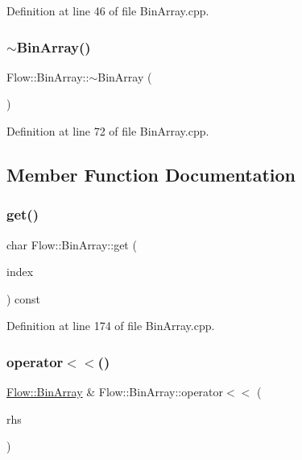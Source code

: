 Definition at line 46 of file Bin\+Array.\+cpp.

\hypertarget{class_flow_1_1_bin_array_afaf8118b48d7d9805369942397bf8ed1}{}\label{class_flow_1_1_bin_array_afaf8118b48d7d9805369942397bf8ed1} 
\subsubsection{\texorpdfstring{$\sim$\+Bin\+Array()}{~BinArray()}}
{\footnotesize\ttfamily Flow\+::\+Bin\+Array\+::$\sim$\+Bin\+Array (\begin{DoxyParamCaption}{ }\end{DoxyParamCaption})}



Definition at line 72 of file Bin\+Array.\+cpp.



\subsection{Member Function Documentation}
\hypertarget{class_flow_1_1_bin_array_ae8b13ba75aee1860d94fbd3e4309453b}{}\label{class_flow_1_1_bin_array_ae8b13ba75aee1860d94fbd3e4309453b} 
\subsubsection{\texorpdfstring{get()}{get()}}
{\footnotesize\ttfamily char Flow\+::\+Bin\+Array\+::get (\begin{DoxyParamCaption}\item[{unsigned int}]{index }\end{DoxyParamCaption}) const}



Definition at line 174 of file Bin\+Array.\+cpp.

\hypertarget{class_flow_1_1_bin_array_ae96cbeda3525a0573a4714d6f92cca08}{}\label{class_flow_1_1_bin_array_ae96cbeda3525a0573a4714d6f92cca08} 
\subsubsection{\texorpdfstring{operator$<$$<$()}{operator<<()}}
{\footnotesize\ttfamily \hyperlink{class_flow_1_1_bin_array}{Flow\+::\+Bin\+Array} \& Flow\+::\+Bin\+Array\+::operator$<$$<$ (\begin{DoxyParamCaption}\item[{const \hyperlink{class_flow_1_1_bin_array}{Bin\+Array} \&}]{rhs }\end{DoxyParamCaption})}




